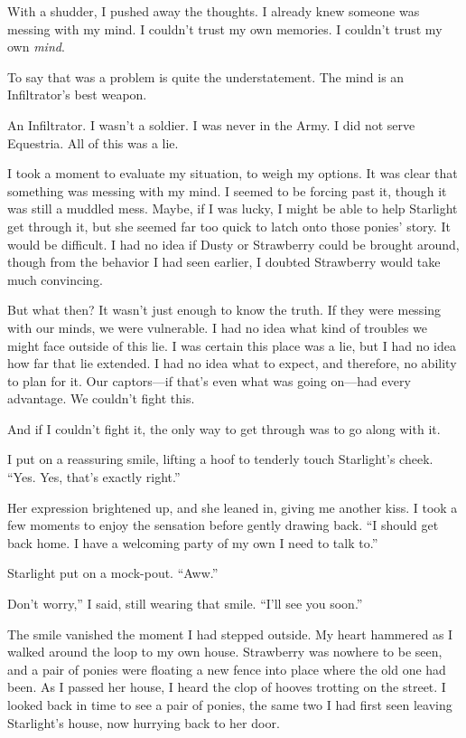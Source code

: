 With a shudder, I pushed away the thoughts. I already knew someone was messing with my mind. I couldn’t trust my own memories. I couldn’t trust my own \textit{mind}.

To say that was a problem is quite the understatement. The mind is an Infiltrator’s best weapon.

An Infiltrator. I wasn’t a soldier. I was never in the Army. I did not serve Equestria. All of this was a lie.

I took a moment to evaluate my situation, to weigh my options. It was clear that something was messing with my mind. I seemed to be forcing past it, though it was still a muddled mess. Maybe, if I was lucky, I might be able to help Starlight get through it, but she seemed far too quick to latch onto those ponies’ story. It would be difficult. I had no idea if Dusty or Strawberry could be brought around, though from the behavior I had seen earlier, I doubted Strawberry would take much convincing.

But what then? It wasn’t just enough to know the truth. If they were messing with our minds, we were vulnerable. I had no idea what kind of troubles we might face outside of this lie. I was certain this place was a lie, but I had no idea how far that lie extended. I had no idea what to expect, and therefore, no ability to plan for it. Our captors—if that’s even what was going on—had every advantage. We couldn’t fight this.

And if I couldn’t fight it, the only way to get through was to go along with it.

I put on a reassuring smile, lifting a hoof to tenderly touch Starlight’s cheek. “Yes. Yes, that’s exactly right.”

Her expression brightened up, and she leaned in, giving me another kiss. I took a few moments to enjoy the sensation before gently drawing back. “I should get back home. I have a welcoming party of my own I need to talk to.”

Starlight put on a mock-pout. “Aww.”

\leavevmode{}Don’t worry,” I said, still wearing that smile. “I’ll see you soon.”

The smile vanished the moment I had stepped outside. My heart hammered as I walked around the loop to my own house. Strawberry was nowhere to be seen, and a pair of ponies were floating a new fence into place where the old one had been. As I passed her house, I heard the clop of hooves trotting on the street. I looked back in time to see a pair of ponies, the same two I had first seen leaving Starlight’s house, now hurrying back to her door.

